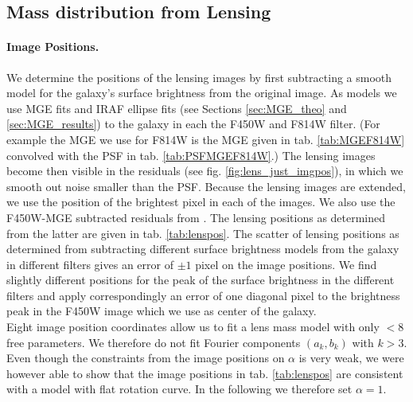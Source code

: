\subsection{Mass distribution from Lensing} \label{sec:results_lensing}

\paragraph{Image Positions.} We determine the positions of the lensing images by first subtracting a smooth model for the galaxy's surface brightness from the original image. As models we use MGE fits and IRAF ellipse fits  (see Sections \ref{sec:MGE_theo} and \ref{sec:MGE_results})  to the galaxy in each the F450W and F814W filter. (For example the MGE we use for F814W is the MGE given in tab. \ref{tab:MGEF814W} convolved with the PSF in tab. \ref{tab:PSFMGEF814W}.) The lensing images become then visible in the residuals (see fig. \ref{fig:lens_just_imgpos}), in which we smooth out noise smaller than the PSF. Because the lensing images are extended, we use the position of the brightest pixel in each of the images. We also use the F450W-MGE subtracted residuals from \citet{SWELLSIII}. The lensing positions as determined from the latter are given in tab. \ref{tab:lenspos}. The scatter of lensing positions as determined from subtracting different surface brightness models from the galaxy in different filters gives an error of $\pm 1$ pixel on the image positions. We find slightly different positions for the peak of the surface brightness in the different filters and apply correspondingly an error of one diagonal pixel to the brightness peak in the F450W image which we use as center of the galaxy.
\\Eight image position coordinates allow us to fit a lens mass model with only $<8$ free parameters. We therefore do not fit Fourier components $(a_k,b_k)$ with $k > 3$.
\\Even though the constraints from the image positions on $\alpha$ is very weak, we were however able to show that the image positions in tab. \ref{tab:lenspos} are consistent with a model with flat rotation curve. In the following we therefore set $\alpha=1$.

